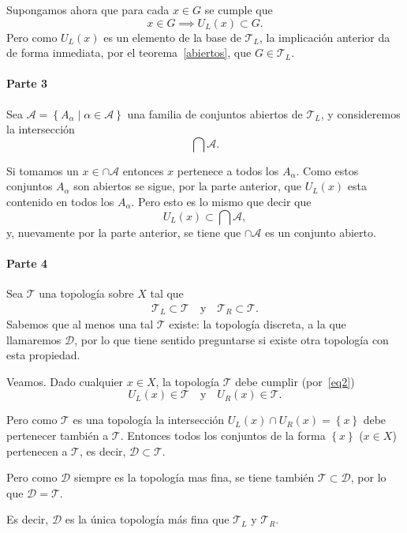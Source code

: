 \documentclass[fleqn,leqno,11pt,letterpaper,final]{article}
\begin{document}
Supongamos ahora que para cada $x\in G$ se cumple que
\[
x\in G\implies U_L(x)\subset G.
\]
Pero como $U_L(x)$ es un elemento de la base de $\mathcal{T}_L$, la implicación anterior
da de forma inmediata, por el teorema~\ref{abiertos}, que $G\in\mathcal{T}_L$.

\paragraph{Parte 3}%

Sea $\mathcal{A}=\left\{ A_\alpha\mid\alpha\in\mathscr{A} \right\}$ una familia de conjuntos abiertos
de $\mathcal{T}_L$, y consideremos la intersección
\[
\bigcap\mathcal{A}.
\]

Si tomamos un $x\in\cap\mathcal{A}$ entonces $x$ pertenece a todos los $A_\alpha$. Como estos conjuntos
$A_\alpha$ son abiertos se sigue, por la parte anterior, que $U_L(x)$ esta contenido en todos
los $A_\alpha$. Pero esto es lo mismo que decir que
\[
U_L(x)\subset\bigcap\mathcal{A},
\]
y, nuevamente por la parte anterior, se tiene que $\cap\mathcal{A}$ es un conjunto abierto. 

\paragraph{Parte 4}%

Sea $\mathcal{T}$ una topología sobre $X$ tal que
\begin{align}\label{eq2}
\mathcal{T}_L\subset\mathcal{T}\quad\text{y}\quad\mathcal{T}_R\subset\mathcal{T}.
\end{align}
Sabemos que al menos una tal $\mathcal{T}$ existe: la topología discreta, a la que llamaremos $\mathcal{D}$, por lo que
tiene sentido preguntarse si existe otra topología con esta propiedad.

Veamos. Dado cualquier $x\in X$, la topología $\mathcal{T}$ debe cumplir (por~\ref{eq2})
\[
U_L(x)\in\mathcal{T}\quad\text{y}\quad U_R(x)\in\mathcal{T}.
\]

Pero como $\mathcal{T}$ es una topología la intersección $U_L(x)\cap U_R(x)=\left\{ x \right\}$ debe pertenecer también a $\mathcal{T}.$
Entonces todos los conjuntos de la forma $\left\{ x \right\}$ ($x\in X$) pertenecen a $\mathcal{T}$, es decir, $\mathcal{D}\subset\mathcal{T}$.

Pero como $\mathcal{D}$ siempre es la topología mas fina, se tiene también $\mathcal{T}\subset\mathcal{D}$, por lo que
$\mathcal{D}=\mathcal{T}$.

Es decir, $\mathcal{D}$ es la única topología más fina que $\mathcal{T}_L$ y $\mathcal{T}_R$.
\end{document}
